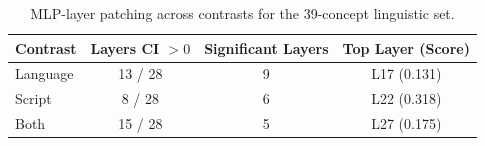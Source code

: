 \begin{table}[t]
\centering
\small
\begin{tabular}{lccc}
\toprule
\textbf{Contrast} & \textbf{Layers CI $>0$} & \textbf{Significant Layers} & \textbf{Top Layer (Score)} \\
\midrule
Language & 13 / 28 & 9 & L17 (0.131) \\
Script & 8 / 28 & 6 & L22 (0.318) \\
Both & 15 / 28 & 5 & L27 (0.175) \\
\bottomrule
\end{tabular}
\caption{MLP-layer patching across contrasts for the 39-concept linguistic set.}
\label{tab:mlp_ling}
\end{table}
